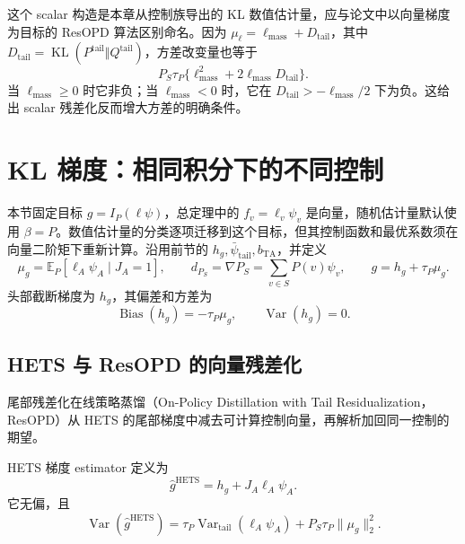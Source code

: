 \documentclass[lang=cn,scheme=chinese,openany]{../book/elegantbook}
\newcommand{\E}{\mathbb E}
\newcommand{\KL}{\operatorname{KL}}
\newcommand{\Var}{\operatorname{Var}}
\newcommand{\tail}{\mathrm{tail}}
\begin{document}
这个 scalar 构造是本章从控制族导出的 KL 数值估计量，应与论文中以向量梯度为目标的 ResOPD 算法区别命名。因为 $\mu_\ell=\ell_{\mathrm{mass}}+D_{\tail}$，其中 $D_{\tail}=\KL(P^{\tail}\Vert Q^{\tail})$，方差改变量也等于
\begin{equation*}
 P_S\tau_P\{\ell_{\mathrm{mass}}^2+2\ell_{\mathrm{mass}}D_{\tail}\}.
\end{equation*}
当 $\ell_{\mathrm{mass}}\geq0$ 时它非负；当 $\ell_{\mathrm{mass}}<0$ 时，它在 $D_{\tail}>-\ell_{\mathrm{mass}}/2$ 下为负。这给出 scalar 残差化反而增大方差的明确条件。



\section{KL 梯度：相同积分下的不同控制}
\label{est:sec:kl-vector}
本节固定目标 $g=I_P(\ell\psi)$，总定理中的 $f_v=\ell_v\psi_v$ 是向量，随机估计量默认使用 $\beta=P$。数值估计量的分类逐项迁移到这个目标，但其控制函数和最优系数须在向量二阶矩下重新计算。沿用前节的 $h_g,\bar \psi_\tail,b_{\mathrm{TA}}$，并定义
\begin{equation*}
 \mu_g=\E_P[\ell_A\psi_A\mid J_A=1],\qquad
 d_{P_S}=\nabla P_S=\sum_{v\in S}P(v)\psi_v,\qquad g=h_g+\tau_P\mu_g.
\end{equation*}
头部截断梯度为 $h_g$，其偏差和方差为
\begin{equation}
 \operatorname{Bias}(h_g)=-\tau_P\mu_g,
 \qquad \Var(h_g)=0.
 \label{est:eq:chapter3-head-grad-bias}
\end{equation}

\subsection{HETS 与 ResOPD 的向量残差化}

尾部残差化在线策略蒸馏（On-Policy Distillation with Tail Residualization，ResOPD）从 HETS 的尾部梯度中减去可计算控制向量，再解析加回同一控制的期望。

HETS 梯度 estimator 定义为
\begin{equation}
 \widehat g^{\mathrm{HETS}}=h_g+J_A \ell_A\psi_A.
 \label{est:eq:chapter3-hets-grad}
\end{equation}
它无偏，且
\begin{equation}
 \Var(\widehat g^{\mathrm{HETS}})
 =\tau_P\Var_{\tail}(\ell_A\psi_A)+P_S\tau_P\lVert\mu_g\rVert_2^2.
 \label{est:eq:chapter3-hets-var}
\end{equation}
\end{document}

